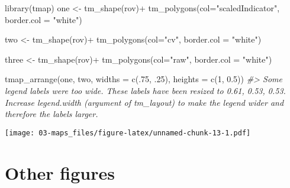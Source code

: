 \documentclass[
]{book}
\newenvironment{Shaded}{\begin{snugshade}}{\end{snugshade}}
\newcommand{\AttributeTok}[1]{\textcolor[rgb]{0.77,0.63,0.00}{#1}}
\newcommand{\CommentTok}[1]{\textcolor[rgb]{0.56,0.35,0.01}{\textit{#1}}}
\newcommand{\DecValTok}[1]{\textcolor[rgb]{0.00,0.00,0.81}{#1}}
\newcommand{\FloatTok}[1]{\textcolor[rgb]{0.00,0.00,0.81}{#1}}
\newcommand{\FunctionTok}[1]{\textcolor[rgb]{0.00,0.00,0.00}{#1}}
\newcommand{\NormalTok}[1]{#1}
\newcommand{\OtherTok}[1]{\textcolor[rgb]{0.56,0.35,0.01}{#1}}
\newcommand{\SpecialCharTok}[1]{\textcolor[rgb]{0.00,0.00,0.00}{#1}}
\newcommand{\StringTok}[1]{\textcolor[rgb]{0.31,0.60,0.02}{#1}}
\begin{document}
\begin{Shaded}
\begin{Highlighting}[]
\FunctionTok{library}\NormalTok{(tmap)}
\NormalTok{one }\OtherTok{\textless{}{-}} \FunctionTok{tm\_shape}\NormalTok{(rov)}\SpecialCharTok{+}
  \FunctionTok{tm\_polygons}\NormalTok{(}\AttributeTok{col=}\StringTok{"scaledIndicator"}\NormalTok{, }
              \AttributeTok{border.col =} \StringTok{"white"}\NormalTok{)}

\NormalTok{two }\OtherTok{\textless{}{-}} \FunctionTok{tm\_shape}\NormalTok{(rov)}\SpecialCharTok{+}
  \FunctionTok{tm\_polygons}\NormalTok{(}\AttributeTok{col=}\StringTok{"cv"}\NormalTok{, }
              \AttributeTok{border.col =} \StringTok{"white"}\NormalTok{)}

\NormalTok{three }\OtherTok{\textless{}{-}} \FunctionTok{tm\_shape}\NormalTok{(rov)}\SpecialCharTok{+}
  \FunctionTok{tm\_polygons}\NormalTok{(}\AttributeTok{col=}\StringTok{"raw"}\NormalTok{, }
              \AttributeTok{border.col =} \StringTok{"white"}\NormalTok{)}


\FunctionTok{tmap\_arrange}\NormalTok{(one, two, }
             \AttributeTok{widths =} \FunctionTok{c}\NormalTok{(.}\DecValTok{75}\NormalTok{, .}\DecValTok{25}\NormalTok{),}
             \AttributeTok{heights =} \FunctionTok{c}\NormalTok{(}\DecValTok{1}\NormalTok{, }\FloatTok{0.5}\NormalTok{))}
\CommentTok{\#\textgreater{} Some legend labels were too wide. These labels have been resized to 0.61, 0.53, 0.53. Increase legend.width (argument of tm\_layout) to make the legend wider and therefore the labels larger.}
\end{Highlighting}
\end{Shaded}

\texttt{[image: 03-maps\_files/figure-latex/unnamed-chunk-13-1.pdf]}

\hypertarget{other-figures}{%
\chapter{Other figures}\label{other-figures}}

  
\end{document}
